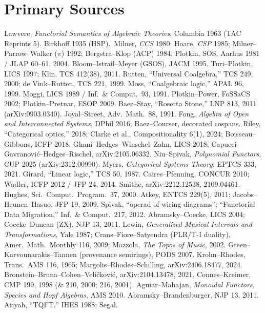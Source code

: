 \documentclass[11pt]{article}
\theoremstyle{plain}
\theoremstyle{definition}
\theoremstyle{remark}
\begin{document}
\appendix
\section{Primary Sources}
{\footnotesize
Lawvere, \emph{Functorial Semantics of Algebraic Theories}, Columbia 1963 (TAC Reprints 5). Birkhoff 1935 (HSP).\ Milner, \emph{CCS} 1980; Hoare, \emph{CSP} 1985; Milner--Parrow--Walker ($\pi$) 1992; Bergstra--Klop (ACP) 1984. Plotkin, SOS, Aarhus 1981 / JLAP 60--61, 2004. Bloom--Istrail--Meyer (GSOS), JACM 1995. Turi--Plotkin, LICS 1997; Klin, TCS 412(38), 2011. Rutten, ``Universal Coalgebra,'' TCS 249, 2000; de Vink--Rutten, TCS 221, 1999. Moss, ``Coalgebraic logic,'' APAL 96, 1999. Moggi, LICS 1989 / Inf.\ \& Comput.\ 93, 1991. Plotkin--Power, FoSSaCS 2002; Plotkin--Pretnar, ESOP 2009. Baez--Stay, ``Rosetta Stone,'' LNP 813, 2011 (arXiv:0903.0340). Joyal--Street, Adv.\ Math.\ 88, 1991. Fong, \emph{Algebra of Open and Interconnected Systems}, DPhil 2016; Baez--Courser, decorated cospans. Riley, ``Categorical optics,'' 2018; Clarke et al., Compositionality 6(1), 2024; Boisseau--Gibbons, ICFP 2018. Ghani--Hedges--Winschel--Zahn, LICS 2018; Capucci--Gavranovi\'c--Hedges--Rischel, arXiv:2105.06332. Niu--Spivak, \emph{Polynomial Functors}, CUP 2025 (arXiv:2312.00990). Myers, \emph{Categorical Systems Theory}; EPTCS 333, 2021. Girard, ``Linear logic,'' TCS 50, 1987. Caires--Pfenning, CONCUR 2010; Wadler, ICFP 2012 / JFP 24, 2014. Smithe, arXiv:2212.12538, 2109.04461. Hughes, Sci.\ Comput.\ Program.\ 37, 2000. Atkey, ENTCS 229(5), 2011; Jacobs--Heunen--Hasuo, JFP 19, 2009. Spivak, ``operad of wiring diagrams''; ``Functorial Data Migration,'' Inf.\ \& Comput.\ 217, 2012. Abramsky--Coecke, LICS 2004; Coecke--Duncan (ZX), NJP 13, 2011. Lewin, \emph{Generalized Musical Intervals and Transformations}, Yale 1987; Crans--Fiore--Satyendra (PLR/T-I duality), Amer.\ Math.\ Monthly 116, 2009; Mazzola, \emph{The Topos of Music}, 2002. Green--Karvounarakis--Tannen (provenance semirings), PODS 2007. Krohn--Rhodes, Trans.\ AMS 116, 1965; Margolis--Rhodes--Schilling, arXiv:2406.18477, 2024. Bronstein--Bruna--Cohen--Veli\v{c}kovi\'c, arXiv:2104.13478, 2021. Connes--Kreimer, CMP 199, 1998 (\& 210, 2000; 216, 2001). Aguiar--Mahajan, \emph{Monoidal Functors, Species and Hopf Algebras}, AMS 2010. Abramsky--Brandenburger, NJP 13, 2011. Atiyah, ``TQFT,'' IHES 1988; Segal.
}
\end{document}
